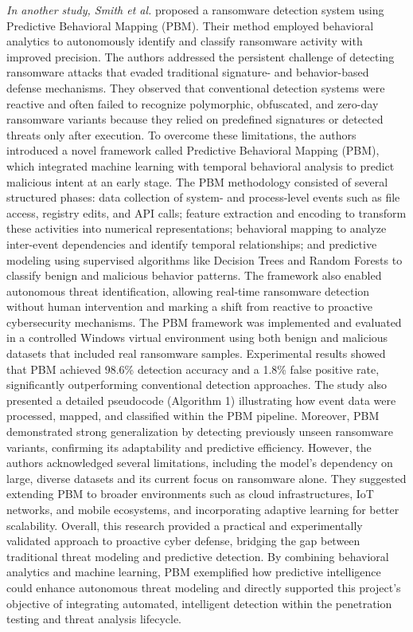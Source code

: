 \textit{In another study, Smith et al.} proposed a ransomware detection system using Predictive Behavioral Mapping (PBM). Their method employed behavioral analytics to autonomously identify and classify ransomware activity with improved precision. The authors addressed the persistent challenge of detecting ransomware attacks that evaded traditional signature- and behavior-based defense mechanisms. They observed that conventional detection systems were reactive and often failed to recognize polymorphic, obfuscated, and zero-day ransomware variants because they relied on predefined signatures or detected threats only after execution. To overcome these limitations, the authors introduced a novel framework called Predictive Behavioral Mapping (PBM), which integrated machine learning with temporal behavioral analysis to predict malicious intent at an early stage. The PBM methodology consisted of several structured phases: data collection of system- and process-level events such as file access, registry edits, and API calls; feature extraction and encoding to transform these activities into numerical representations; behavioral mapping to analyze inter-event dependencies and identify temporal relationships; and predictive modeling using supervised algorithms like Decision Trees and Random Forests to classify benign and malicious behavior patterns. The framework also enabled autonomous threat identification, allowing real-time ransomware detection without human intervention and marking a shift from reactive to proactive cybersecurity mechanisms. The PBM framework was implemented and evaluated in a controlled Windows virtual environment using both benign and malicious datasets that included real ransomware samples. Experimental results showed that PBM achieved 98.6\% detection accuracy and a 1.8\% false positive rate, significantly outperforming conventional detection approaches. The study also presented a detailed pseudocode (Algorithm 1) illustrating how event data were processed, mapped, and classified within the PBM pipeline. Moreover, PBM demonstrated strong generalization by detecting previously unseen ransomware variants, confirming its adaptability and predictive efficiency. However, the authors acknowledged several limitations, including the model's dependency on large, diverse datasets and its current focus on ransomware alone. They suggested extending PBM to broader environments such as cloud infrastructures, IoT networks, and mobile ecosystems, and incorporating adaptive learning for better scalability. Overall, this research provided a practical and experimentally validated approach to proactive cyber defense, bridging the gap between traditional threat modeling and predictive detection. By combining behavioral analytics and machine learning, PBM exemplified how predictive intelligence could enhance autonomous threat modeling and directly supported this project's objective of integrating automated, intelligent detection within the penetration testing and threat analysis lifecycle. \cite{smith2023}

